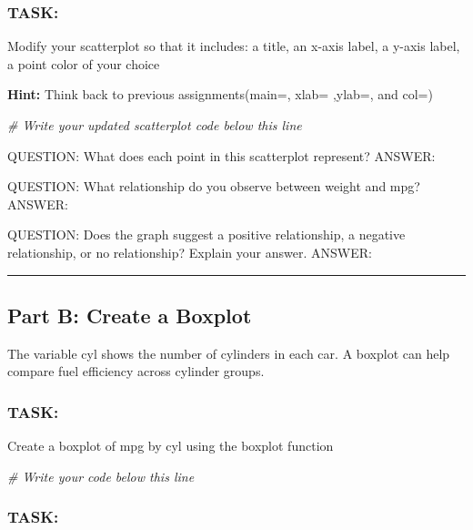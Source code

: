\documentclass[
]{article}
\newenvironment{Shaded}{\begin{snugshade}}{\end{snugshade}}
\newcommand{\CommentTok}[1]{\textcolor[rgb]{0.56,0.35,0.01}{\textit{#1}}}
\begin{document}
\subsubsection{TASK:}\label{task-1}

Modify your scatterplot so that it includes: a title, an x-axis label, a
y-axis label, a point color of your choice

\textbf{Hint:} Think back to previous assignments(main=, xlab= ,ylab=,
and col=)

\begin{Shaded}
\begin{Highlighting}[]
\CommentTok{\# Write your updated scatterplot code below this line}
\end{Highlighting}
\end{Shaded}

QUESTION: What does each point in this scatterplot represent? ANSWER:

QUESTION: What relationship do you observe between weight and mpg?
ANSWER:

QUESTION: Does the graph suggest a positive relationship, a negative
relationship, or no relationship? Explain your answer. ANSWER:

\begin{center}\rule{0.5\linewidth}{0.5pt}\end{center}

\subsection{Part B: Create a Boxplot}\label{part-b-create-a-boxplot}

The variable cyl shows the number of cylinders in each car. A boxplot
can help compare fuel efficiency across cylinder groups.

\subsubsection{TASK:}\label{task-2}

Create a boxplot of mpg by cyl using the boxplot function

\begin{Shaded}
\begin{Highlighting}[]
\CommentTok{\# Write your code below this line}
\end{Highlighting}
\end{Shaded}

\subsubsection{TASK:}\label{task-3}
\end{document}
